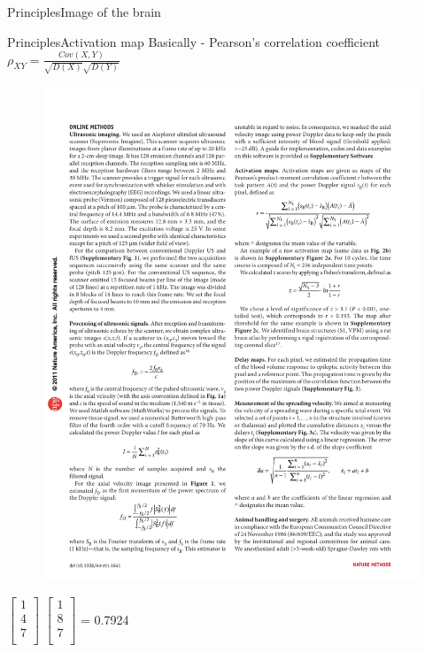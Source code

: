 \documentclass{beamer}
\begin{document}
\begin{frame}{Principles}{Image of the brain}

\end{frame}
\begin{frame}{Principles}{Activation map}
\centering
\alert{Basically - Pearson's correlation coefficient}\\
\large
$\rho_{XY} = \frac{Cov(X,Y)}{\sqrt{D(X)}\sqrt{D(Y)}}$
\pause
	\begin{figure}
		\centering
		\includegraphics[width=1\linewidth]{formula}
	\end{figure}
	
$\left[
\begin{array}{ccc}
1\\
4\\
7\\
\end{array}
\right]$
$\left[
\begin{array}{ccc}
1\\
8\\
7\\
\end{array}
\right]$ = 0.7924
\end{frame}
\end{document}
